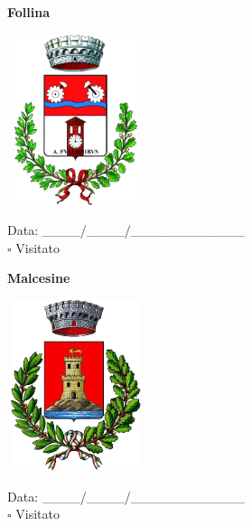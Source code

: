 \documentclass[a5paper,12pt]{article}
\begin{document}
\newpage

\noindent
\begin{minipage}[t]{0.45\textwidth}
    \begin{center}
        \textbf{Follina}
    \end{center}
    \vspace{-0.5cm} %
    \begin{center}
        \includegraphics[height= 5cm, width=4cm]{Veneto/Stemma Follina.png}
    \end{center}
    \vspace{-0.4cm} %
    \begin{flushleft}
        Data: \_\_\_\_/\_\_\_\_/\_\_\_\_\_\_\_\_\_\_\_\_ \\
        $\square$ Visitato
    \end{flushleft}
\end{minipage}
\hfill
\noindent
\begin{minipage}[t]{0.45\textwidth}
    \begin{center}
        \textbf{Malcesine}
    \end{center}
    \vspace{-0.5cm} %
    \begin{center}
        \includegraphics[height= 5cm, width=4cm]{Veneto/Stemma Malcesine.png}
    \end{center}
    \vspace{-0.4cm} %
    \begin{flushleft}
        Data: \_\_\_\_/\_\_\_\_/\_\_\_\_\_\_\_\_\_\_\_\_ \\
        $\square$ Visitato
    \end{flushleft}
\end{minipage}
\end{document}
